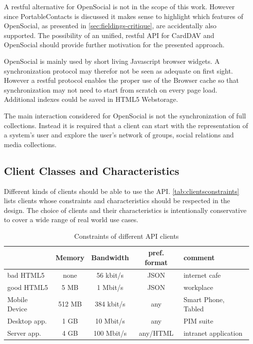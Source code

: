\documentclass[12pt,a4paper,twoside]{scrartcl}		%
\begin{document}
A restful alternative for OpenSocial is not in the scope of this work. However
since PortableContacts is discussed it makes sense to highlight which features
of OpenSocial, as presented in \autoref{sec:fieldings-critique}, are
accidentally also supported. The possibility of an unified, restful API for
CardDAV and OpenSocial should provide further motivation for the presented
approach.

OpenSocial is mainly used by short living Javascript browser widgets. A
synchronization protocol may therefor not be seen as adequate on first
sight. However a restful protocol enables the proper use of the Browser cache so
that synchronization may not need to start from scratch on every page
load. Additional indexes could be saved in HTML5 Webstorage\cite{Hickson2011b}.

The main interaction considered for OpenSocial is not the synchronization of
full collections. Instead it is required that a client can start with the
representation of a system's user and explore the user's network of groups,
social relations and media collections.

\subsection{Client Classes and Characteristics}
\label{sec:user-class-char}

Different kinds of clients should be able to use the API.
\autoref{tab:clientsconstraints} lists clients whose constraints and
characteristics should be respected in the design. The choice of clients and their
characteristics is intentionally conservative to cover a wide range of real
world use cases.

\begin{table}[tbh]
  \centering
  \begin{tabular}[tbh]{ l || c | c | c | l }
                & Memory & Bandwidth & pref. format & comment \\  \hline
  bad HTML5 & none & 56 kbit/s & JSON & internet cafe\\
  good HTML5 & 5 MB & 1 Mbit/s & JSON & workplace\\
  Mobile Device &  512 MB & 384 kbit/s & any & Smart Phone, Tabled \\ 
  Desktop app. &  1 GB & 10 Mbit/s  & any & PIM suite \\
  Server app.  &  4 GB & 100 Mbit/s & any/HTML & intranet application \\
  \end{tabular}
  \caption{Constraints of different API clients}
  \label{tab:clientsconstraints}
\end{table}
\end{document}
